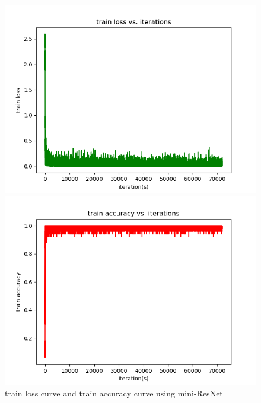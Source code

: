 \documentclass{elegantbook}
\begin{document}
\begin{figure}[!h]
	\centering
	\begin{minipage}[t]{0.48\textwidth}
		\centering
		\includegraphics[width=\textwidth]{../results/trainloss-resnet}
	\end{minipage}
	\begin{minipage}[t]{0.48\textwidth}
		\centering
		\includegraphics[width=\textwidth]{../results/trainacc-resnet}
	\end{minipage}
	\caption{\label{trainres-resnet}train loss curve and train accuracy curve using mini-ResNet}
\end{figure}
\end{document}
